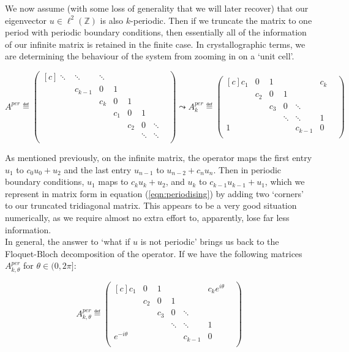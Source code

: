 \documentclass[../main.tex]{subfiles}
\begin{document}
We now assume (with some loss of generality that we will later recover) that our eigenvector $u \in \ell^2(\mathbb{Z})$ is also $k$-periodic. Then if we truncate the matrix to one period with periodic boundary conditions, then essentially all of the information of our infinite matrix is retained in the finite case. In crystallographic terms, we are determining the behaviour of the system from zooming in on a `unit cell'.

\begin{equation}\label{eqn:periodising}
A^{per} \eqdef
\begin{pmatrix*}[c]
\ddots & \ddots & \ddots & & & &\\
& c_{k-1} & 0 & 1 & & & &\\
& & c_{k} & 0 & 1 & & &\\
& & & c_1 & 0 & 1 & \\
& &&  & c_2 & 0 & \ddots \\
& & & & & \ddots & \ddots & \\
\end{pmatrix*}
\leadsto A^{per}_k \eqdef
\begin{pmatrix*}[c]
c_1 & 0 & 1 & & & c_{k}\\
& c_2 & 0 & 1 & & & \\
& & c_3 & 0 & \ddots & & \\
& & & \ddots & \ddots & 1 & \\
1 & & & & c_{k-1} & 0\\
\end{pmatrix*}
\end{equation}

As mentioned previously, on the infinite matrix, the operator maps the first entry $u_1$ to $c_0 u_0 + u_2$ and the last entry $u_{n-1}$ to $u_{n-2} + c_{n} u_{n}$. Then in periodic boundary conditions, $u_1$ maps to $c_k u_k + u_2$, and  $u_{k}$ to $c_{k-1} u_{k-1} + u_{1}$, which we represent in matrix form in equation (\ref{eqn:periodising}) by adding two `corners' to our truncated tridiagonal matrix. This appears to be a very good situation numerically, as we require almost no extra effort to, apparently, lose far less information.\\

In general, the answer to `what if $u$ is not periodic' brings us back to the Floquet-Bloch decomposition of the operator. If we have the following matrices $A^{per}_{k, \theta}$ for $\theta \in (0, 2 \pi]$:

$$
A^{per}_{k, \theta} \eqdef
\begin{pmatrix*}[c]
c_1 & 0 & 1 & & & c_{k} e^{i \theta}\\
& c_2 & 0 & 1 & & & \\
& & c_3 & 0 & \ddots & & \\
& & & \ddots & \ddots & 1 & \\
e^{- i \theta} & & & & c_{k-1} & 0\\
\end{pmatrix*}
$$
\end{document}
